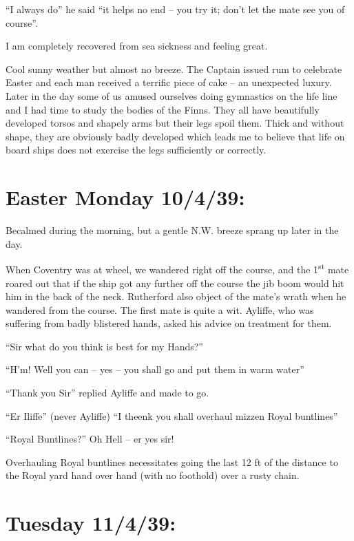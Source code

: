 \documentclass[
  11pt,
  msmallroyalvopaper
]{memoir}
\begin{document}
``I always do'' he said ``it helps no end -- you try it; don't let the
mate see you of course''.

I am completely recovered from sea sickness and feeling great.

Cool sunny weather but almost no breeze. The Captain issued rum to
celebrate Easter and each man received a terrific piece of cake -- an
unexpected luxury. Later in the day some of us amused ourselves doing
gymnastics on the life line and I had time to study the bodies of the
Finns. They all have beautifully developed torsos and shapely arms but
their legs spoil them. Thick and without shape, they are obviously badly
developed which leads me to believe that life on board ships does not
exercise the legs sufficiently or correctly.

\hypertarget{easter-monday-10439}{%
\section{Easter Monday 10/4/39:}\label{easter-monday-10439}}

Becalmed during the morning, but a gentle N.W. breeze sprang up later in
the day.

When Coventry was at wheel, we wandered right off the course, and the
1\textsuperscript{st} mate roared out that if the ship got any further
off the course the jib boom would hit him in the back of the neck.
Rutherford also object of the mate's wrath when he wandered from the
course. The first mate is quite a wit. Ayliffe, who was suffering from
badly blistered hands, asked his advice on treatment for them.

``Sir what do you think is best for my Hands?''

``H'm! Well you can -- yes -- you shall go and put them in warm water''

``Thank you Sir'' replied Ayliffe and made to go.

``Er Iliffe'' (never Ayliffe) ``I theenk you shall overhaul mizzen Royal
buntlines''

``Royal Buntlines?'' Oh Hell -- er yes sir!

Overhauling Royal buntlines necessitates going the last 12 ft of the
distance to the Royal yard hand over hand (with no foothold) over a
rusty chain.

\hypertarget{tuesday-11439}{%
\section{Tuesday 11/4/39:}\label{tuesday-11439}}
\end{document}

